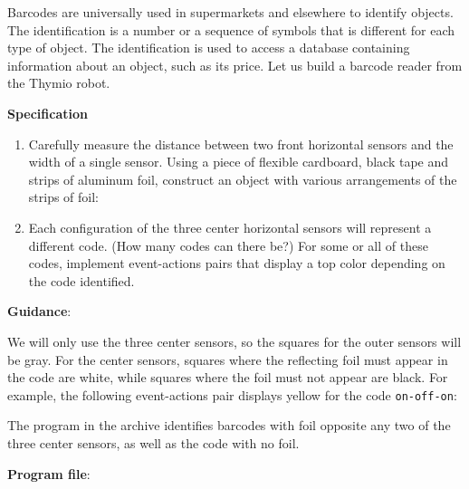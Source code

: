 \label{ch.barcode}

Barcodes are universally used in supermarkets and elsewhere to identify
objects. The identification is a number or a sequence of symbols that is
different for each type of object. The identification is used to access
a database containing information about an object, such as its price.
Let us build a barcode reader from the Thymio robot.

\textbf{Specification}

\begin{enumerate}
\item Carefully measure the distance between two front horizontal
sensors and the width of a single sensor.
Using a piece of flexible cardboard, black tape and strips of aluminum
foil, construct an object with various arrangements of the strips of foil:

\begin{center}
\end{center}

\item Each configuration of the three center horizontal sensors will
represent a different code. (How many codes can there be?) For some or
all of these codes, implement event-actions pairs that display a top
color depending on the code identified.

\end{enumerate}

\textbf{Guidance}:

We will only use the three center sensors, so the squares for the
outer sensors will be gray. For the center sensors, squares where the
reflecting foil must appear in the code are white, while squares where
the foil must not appear are black. For example, the following
event-actions pair displays yellow for the code \texttt{on-off-on}:


The program in the archive identifies barcodes with foil opposite any
two of the three center sensors, as well as the code with no foil.

{\raggedleft \hfill \textbf{Program file}: }
